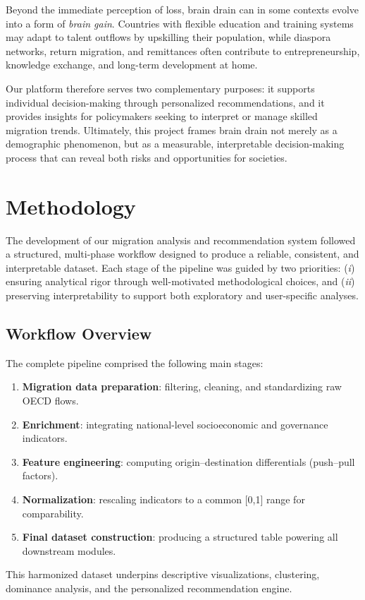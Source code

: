 \documentclass[11pt]{article}
\begin{document}
\noindent
Beyond the immediate perception of loss, brain drain can in some contexts evolve into a form of \textit{brain gain}. Countries with flexible education and training systems may adapt to talent outflows by upskilling their population, while diaspora networks, return migration, and remittances often contribute to entrepreneurship, knowledge exchange, and long-term development at home.  

\noindent
Our platform therefore serves two complementary purposes: it supports individual decision-making through personalized recommendations, and it provides insights for policymakers seeking to interpret or manage skilled migration trends. Ultimately, this project frames brain drain not merely as a demographic phenomenon, but as a measurable, interpretable decision-making process that can reveal both risks and opportunities for societies.





\newpage

\section{Methodology}

\noindent
The development of our migration analysis and recommendation system followed a structured, multi-phase workflow designed to produce a reliable, consistent, and interpretable dataset. Each stage of the pipeline was guided by two priorities: (\textit{i}) ensuring analytical rigor through well-motivated methodological choices, and (\textit{ii}) preserving interpretability to support both exploratory and user-specific analyses.

\subsection{Workflow Overview}
The complete pipeline comprised the following main stages:
\begin{enumerate}
    \item \textbf {Migration data preparation}: filtering, cleaning, and standardizing raw OECD flows.
    \item \textbf {Enrichment}: integrating national-level socioeconomic and governance indicators.
    \item \textbf {Feature engineering}: computing origin–destination differentials (push–pull factors).
    \item \textbf {Normalization}: rescaling indicators to a common [0,1] range for comparability.
    \item \textbf {Final dataset construction}: producing a structured table powering all downstream modules.
\end{enumerate}
This harmonized dataset underpins descriptive visualizations, clustering, dominance analysis, and the personalized recommendation engine.
\end{document}

